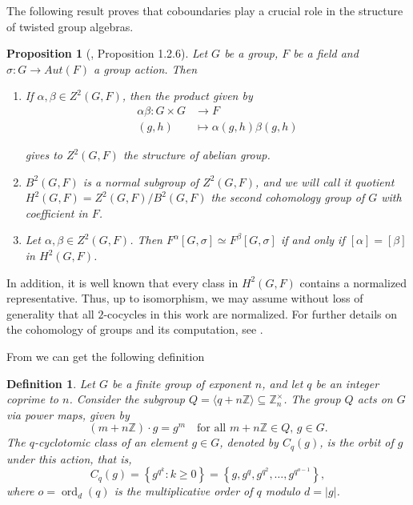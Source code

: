 \documentclass{article}
\newtheorem{proposition}[theorem]{Proposition}
\newtheorem{definition}{Definition}
\begin{document}
The following result proves that coboundaries play a crucial role in the structure of twisted group algebras.
\begin{proposition}[\cite{linckelmann2018block}, Proposition 1.2.6]
     Let $G$ be a group,  $F$ be a field  and $\sigma:G \longrightarrow Aut(F)$ a group action. Then
     \begin{enumerate}
     \renewcommand{\labelenumi}{(\roman{enumi})}
         \item If $\alpha,\beta\in Z^2(G,F)$, then the product given by 
         \begin{align*}
             \alpha\beta: G\times G &\longrightarrow F \\
             (g,h) &\longmapsto \alpha(g,h) \beta(g,h)
         \end{align*}
     
     gives to $Z^2(G,F)$ the structure of abelian group.
     \item $B^2(G,F)$ is a normal subgroup of $Z^2(G,F)$, and we will call it quotient $H^2(G,F)=Z^2(G,F)/B^2(G,F)$ the second cohomology group of $G$ with coefficient in $F$.
     \item Let  $\alpha,\beta\in Z^2(G,F)$. Then $F^\alpha [G,\sigma] \simeq F^\beta [G,\sigma]$ if and only if $[\alpha] = [\beta]$ in $H^2(G,F)$.
     \end{enumerate}
\end{proposition}

In addition, it is well known that every class in $H^2(G,F)$ contains a normalized representative. Thus, up to isomorphism, we may assume without loss of generality that all $2$-cocycles in this work are normalized. For further details on the cohomology of groups and its computation, see \cite{brown1982cohomology}.

From \cite{JespersLealPaques2003} we can get the following definition

\begin{definition}
Let $G$ be a finite group of exponent $n$, and let $q$ be an integer coprime to $n$. Consider the subgroup $Q = \langle q + n\mathbb{Z} \rangle \subseteq \mathbb{Z}_n^\times$. The group $Q$ acts on $G$ via power maps, given by
\[
  (m + n\mathbb{Z}) \cdot g = g^m \quad \text{for all } m + n\mathbb{Z} \in Q, \, g \in G.
\]
The \emph{$q$-cyclotomic class} of an element $g \in G$, denoted by $C_q(g)$, is the orbit of $g$ under this action, that is,
\[
  C_q(g) = \left\{ g^{q^k} : k \ge 0 \right\} = \left\{ g, g^q, g^{q^2}, \dots, g^{q^{o-1}} \right\},
\]
where $o = \operatorname{ord}_d(q)$ is the multiplicative order of $q$ modulo $d = |g|$.
\end{definition}
\end{document}
